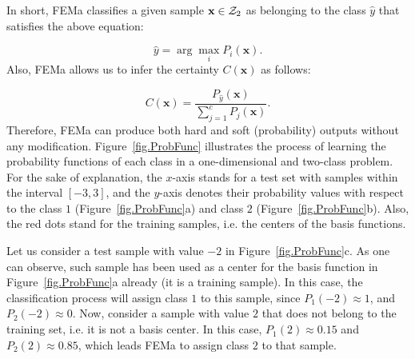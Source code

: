 In short, FEMa classifies a given sample $\textbf{x}\in{\cal Z}_2$ as belonging to the class $\hat{y}$ that satisfies the above equation:

\begin{equation}
	\hat{y} = \arg\max_{i}P_i(\textbf{x}).
\end{equation}
Also, FEMa allows us to infer the certainty $C(\textbf{x})$ as follows:

\begin{equation}
\label{eq.certainty}
	C(\textbf{x})=\frac{P_{\hat{y}}(\textbf{x})}{\sum_{j=1}^cP_j(\textbf{x})}.
\end{equation}
Therefore, FEMa can produce both hard and soft (probability) outputs without any modification. Figure~\ref{fig.ProbFunc} illustrates the process of learning the probability functions of each class in a one-dimensional and two-class problem. For the sake of explanation, the $x$-axis stands for a test set with samples within the interval $[-3,3]$, and the $y$-axis denotes their probability values with respect to the class $1$ (Figure~\ref{fig.ProbFunc}a) and class $2$ (Figure~\ref{fig.ProbFunc}b). Also, the red dots stand for the training samples, i.e. the centers of the basis functions.

Let us consider a test sample with value $-2$ in Figure~\ref{fig.ProbFunc}c. As one can observe, such sample has been used as a center for the basis function in Figure~\ref{fig.ProbFunc}a already (it is a training sample). In this case, the classification process will assign class $1$ to this sample, since $P_1(-2)\approx 1$, and $P_2(-2)\approx 0$. Now, consider a sample with value $2$ that does not belong to the training set, i.e. it is not a basis center. In this case, $P_1(2)\approx 0.15$ and $P_2(2)\approx 0.85$, which leads FEMa to assign class $2$ to that sample.

